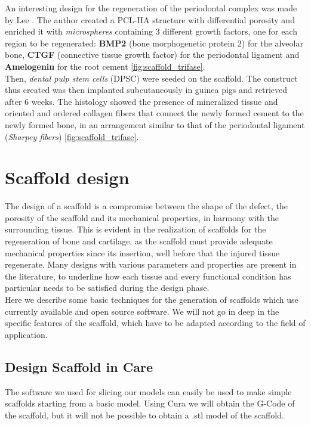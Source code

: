 An interesting design for the regeneration of the periodontal complex was made by Lee \parencite{Reference135}. The author created a PCL-HA structure with differential porosity and enriched it with \emph{microspheres} containing 3 different growth factors, one for each region to be regenerated: \textbf{BMP2} (bone morphogenetic protein 2) for the alveolar bone, \textbf{CTGF} (connective tissue growth factor) for the periodontal ligament and \textbf{Amelogenin} for the root cement \ref{fig:scaffold_trifase}. \\
Then, \emph{dental pulp stem cells} (DPSC) were seeded on the scaffold. The construct thus created was then implanted subcutaneously in guinea pigs and retrieved after 6 weeks. The histology showed the presence of mineralized tissue and oriented and ordered collagen fibers that connect the newly formed cement to the newly formed bone, in an arrangement similar to that of the periodontal ligament (\emph{Sharpey fibers}) \ref{fig:scaffold_trifase}.

\section{Scaffold design}
The design of a scaffold is a compromise between the shape of the defect, the porosity of the scaffold and its mechanical properties, in harmony with the surrounding tissue. This is evident in the realization of scaffolds for the regeneration of bone and cartilage, as the scaffold must provide adequate mechanical properties since its insertion, well before that the injured tissue regenerate. Many designs with various parameters and properties are present in the literature, to underline how each tissue and every functional condition has particular needs to be satisfied during the design phase. \\
Here we describe some basic techniques for the generation of scaffolds which use currently available and open source software. We will not go in deep in the specific features of the scaffold, which have to be adapted according to the field of application.

\subsection{Design Scaffold in Care}
The software we used for slicing our models can easily be used to make simple scaffolds starting from a basic model. Using Cura we will obtain the G-Code of the scaffold, but it will not be possible to obtain a .stl model of the scaffold.

